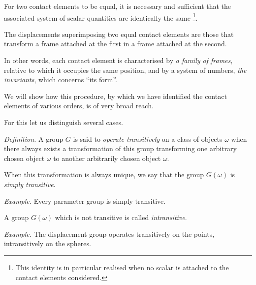 \somespace

For two contact elements to be equal, it is necessary and sufficient that the associated system of scalar quantities are identically the same \footnote{This identity is in particular realised when no scalar is attached to the contact elements considered.}.

The displacements superimposing two equal contact elements are those that transform a frame attached at the first in a frame attached at the second.

In other words, each contact element is characterised by \emph{a family of frames}, relative to which it occupies the same position, and by a system of numbers, \emph{the invariants}, which concerns ``its form''.

\somespace

We will show how this procedure, by which we have identified the contact elements of various orders, is of very broad reach.

For this let us distinguish several cases.

\somespace

\emph{Definition.} A group $G$ is said to \emph{operate transitively} on a class of objects $\omega$ when there always exists a transformation of this group transforming one arbitrary chosen object $\omega$ to another arbitrarily chosen object $\omega$.

When this transformation is always unique, we say that the group $G(\omega)$ is \emph{simply transitive}.

\somespace

{\small
\emph{Example.} Every parameter group is simply transitive.
}

\somespace

A group $G(\omega)$ which is not transitive is called \emph{intransitive}.

\somespace
{\small
\emph{Example.} The displacement group operates transitively on the points, intransitively on the spheres.
}


